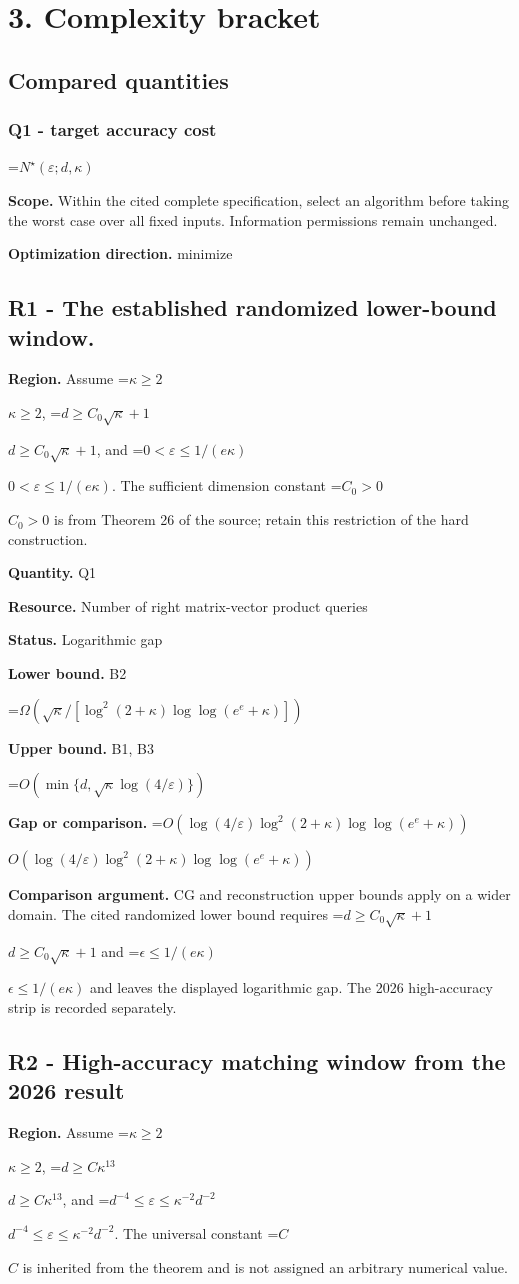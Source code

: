 \documentclass[10pt,a4paper]{article}
\newcommand{\AtlasMath}[1]{\par\begingroup\centering\setbox0=\hbox{$\displaystyle #1$}\ifdim\wd0>1.4\linewidth\typeout{ATLAS WIDE FORMULA: \the\wd0}\fi\ifdim\wd0>\linewidth\resizebox{\linewidth}{!}{\box0}\else\box0\fi\par\endgroup}
\newcommand{\AtlasInlineMath}[1]{\begingroup\setbox0=\hbox{$#1$}\ifdim\wd0>.4\linewidth\endgroup\AtlasMath{#1}\else\endgroup$#1$\fi}
\begin{document}
\section{3. Complexity bracket}
\subsection{Compared quantities}
\subsubsection{Q1 - target accuracy cost}
\AtlasMath{N^\star(\varepsilon;d,\kappa)}
\textbf{Scope.} Within the cited complete specification, select an algorithm before taking the worst case over all fixed inputs. Information permissions remain unchanged.

\textbf{Optimization direction.} minimize

\subsection{R1 - The established randomized lower-bound window.}
\textbf{Region.} Assume \AtlasInlineMath{\kappa\ge2}, \AtlasInlineMath{d\ge C_0\sqrt\kappa+1}, and \AtlasInlineMath{0<\varepsilon\le1/(e\kappa)}. The sufficient dimension constant \AtlasInlineMath{C_0>0} is from Theorem 26 of the source; retain this restriction of the hard construction.

\textbf{Quantity.} Q1

\textbf{Resource.} Number of right matrix-vector product queries

\textbf{Status.} Logarithmic gap

\textbf{Lower bound.} B2

\AtlasMath{\Omega(\sqrt\kappa/[\log^2(2+\kappa)\log\log(e^e+\kappa)])}
\textbf{Upper bound.} B1, B3

\AtlasMath{O(\min\{d,\sqrt\kappa\log(4/\varepsilon)\})}
\textbf{Gap or comparison.} \AtlasInlineMath{O(\log(4/\varepsilon)\log^2(2+\kappa)\log\log(e^e+\kappa))}

\textbf{Comparison argument.} CG and reconstruction upper bounds apply on a wider domain. The cited randomized lower bound requires \AtlasInlineMath{d\ge C_0\sqrt\kappa+1} and \AtlasInlineMath{\epsilon\le1/(e\kappa)} and leaves the displayed logarithmic gap. The 2026 high-accuracy strip is recorded separately.

\subsection{R2 - High-accuracy matching window from the 2026 result}
\textbf{Region.} Assume \AtlasInlineMath{\kappa\ge2}, \AtlasInlineMath{d\ge C\kappa^{13}}, and \AtlasInlineMath{d^{-4}\le\varepsilon\le\kappa^{-2}d^{-2}}. The universal constant \AtlasInlineMath{C} is inherited from the theorem and is not assigned an arbitrary numerical value.
\end{document}
